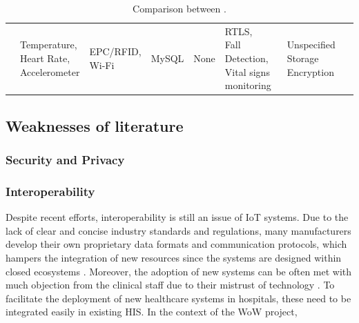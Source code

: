 \begin{table}
\begin{tabular}{l|l|l|l|l|l|l}
          \cite{} & \makecell{Temperature, \\Heart Rate,\\ Accelerometer} & \makecell{EPC/RFID,\\ Wi-Fi} & MySQL & None & \makecell{RTLS, \\ Fall Detection,\\ Vital signs\\ monitoring}& \makecell{Unspecified Storage \\Encryption} \\
        \end{tabular}
      \caption{Comparison between .}
      \label{tab:comparsion-articles}
  \end{table} 
 \renewcommand{\arraystretch}{1}

\clearpage
\subsection{Weaknesses of literature}

\subsubsection{Security and Privacy}


\subsubsection{Interoperability} 

Despite recent efforts, interoperability is still an issue of \acs{IoT} systems. Due to the lack of clear and concise industry standards and regulations, many manufacturers develop their own proprietary data formats and communication protocols, which hampers the integration of new resources since the systems are designed within closed ecosystems \cite{Rubi2019}. Moreover, the adoption of new systems can be often met with much objection from the clinical staff due to their mistrust of technology \cite{DursunErgezen2020}. 
To facilitate the deployment of new healthcare systems in hospitals, these need to be integrated easily in existing \acs{HIS}. \bigskip
In the context of the \acs{WoW} project, 


